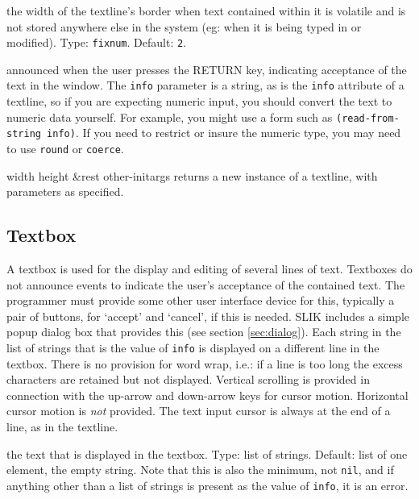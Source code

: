 \documentclass[twoside,openright,11pt]{report}
\newcommand{\tp}[1]{\texttt{#1}}
\begin{document}
{the width of the textline's border when text contained within it is
volatile and is not stored anywhere else in the system (eg: when it is
being typed in or modified).  Type: \tp{fixnum}.  Default:
\tp{2}.}


{announced when the user presses the RETURN key, indicating acceptance
of the text in the window.  The \tp{info} parameter is a string, as is
the \tp{info} attribute of a textline, so if you are expecting numeric
input, you should convert the text to numeric data yourself.  For
example, you might use a form such as \tp{(read-from-string~info)}.}
If you need to restrict or insure the numeric type, you may need to
use \tp{round} or \tp{coerce}.


{width height \&rest other-initargs}
{returns a new instance of a textline, with parameters as specified.}

\subsection{Textbox}

A textbox is used for the display and editing of several lines of
text.  Textboxes do not announce events to indicate the user's
acceptance of the contained text.  The programmer must provide some
other user interface device for this, typically a pair of buttons, for
`accept' and `cancel', if this is needed.  SLIK includes a simple
popup dialog box that provides this (see section \ref{sec:dialog}).
Each string in the list of strings that is the value of \tp{info} is
displayed on a different line in the textbox.  There is no provision
for word wrap, i.e.: if a line is too long the excess characters are
retained but not displayed.  Vertical scrolling is provided in
connection with the up-arrow and down-arrow keys for cursor motion.
Horizontal cursor motion is \emph{not} provided.  The text input
cursor is always at the end of a line, as in the textline.


{the text that is displayed in the textbox.  Type: list of strings.
Default: list of one element, the empty string.  Note that this is
also the minimum, not \tp{nil}, and if anything other than a list
of strings is present as the value of \tp{info}, it is an error.}
\end{document}
